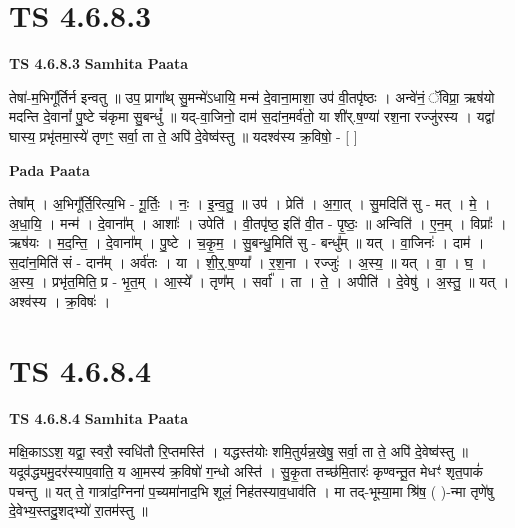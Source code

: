 \documentclass[17pt]{extarticle}
\begin{document}
\section*{ TS 4.6.8.3 }

\textbf{TS 4.6.8.3 } \newline
\textbf{Samhita Paata} \newline

तेषा॑-म॒भिगू᳚र्तिर्न इन्वतु ॥ उप॒ प्रागा᳚थ् सु॒मन्मे॑ऽधायि॒ मन्म॑ दे॒वाना॒माशा॒ उप॑ वी॒तपृ॑ष्ठः । अन्वे॑नं॒ ॅविप्रा॒ ऋष॑यो मदन्ति दे॒वानां᳚ पु॒ष्टे च॑कृमा सु॒बन्धुं᳚ ॥ यद्-वा॒जिनो॒ दाम॑ स॒दांन॒मर्व॑तो॒ या शी॑र्.ष॒ण्या॑ रश॒ना रज्जु॑रस्य । यद्वा॑ घास्य॒ प्रभृ॑तमा॒स्ये॑ तृणꣳ॒॒ सर्वा॒ ता ते॒ अपि॑ दे॒वेष्व॑स्तु ॥ यदश्व॑स्य क्र॒विषो॒ - [  ] \newline

\textbf{Pada Paata} \newline

तेषा᳚म् । अ॒भिगू᳚र्ति॒रित्य॒भि - गू॒र्तिः॒ । नः॒ । इ॒न्व॒तु॒ ॥ उप॑ । प्रेति॑ । अ॒गा॒त् । सु॒मदिति॑ सु - मत् । मे॒ । अ॒धा॒यि॒ । मन्म॑ । दे॒वाना᳚म् । आशाः᳚ । उपेति॑ । वी॒तपृ॑ष्ठ॒ इति॑ वी॒त - पृ॒ष्ठः॒ ॥ अन्विति॑ । ए॒न॒म् । विप्राः᳚ । ऋष॑यः । म॒द॒न्ति॒ । दे॒वाना᳚म् । पु॒ष्टे । च॒कृ॒म॒ । सु॒बन्धु॒मिति॑ सु - बन्धु᳚म् ॥ यत् । वा॒जिनः॑ । दाम॑ । स॒दांन॒मिति॑ सं - दान᳚म् । अर्व॑तः । या । शी॒र्॒.ष॒ण्या᳚ । र॒श॒ना । रज्जुः॑ । अ॒स्य॒ ॥ यत् । वा॒ । घ॒ । अ॒स्य॒ । प्रभृ॑त॒मिति॒ प्र - भृ॒त॒म् । आ॒स्ये᳚ । तृण᳚म् । सर्वा᳚ । ता । ते॒ । अपीति॑ । दे॒वेषु॑ । अ॒स्तु॒ ॥ यत् । अश्व॑स्य । क्र॒विषः॑ ।  \newline




\section*{ TS 4.6.8.4 }

\textbf{TS 4.6.8.4 } \newline
\textbf{Samhita Paata} \newline

मक्षि॒काऽऽश॒ यद्वा॒ स्वरौ॒ स्वधि॑तौ रि॒प्तमस्ति॑ । यद्धस्त॑योः शमि॒तुर्यन्न॒खेषु॒ सर्वा॒ ता ते॒ अपि॑ दे॒वेष्व॑स्तु ॥ यदूव॑द्ध्यमु॒दर॑स्याप॒वाति॒ य आ॒मस्य॑ क्र॒विषो॑ ग॒न्धो अस्ति॑ । सु॒कृ॒ता तच्छ॑मि॒तारः॑ कृण्वन्तू॒त मेधꣳ॑ शृत॒पाकं॑ पचन्तु ॥ यत् ते॒ गात्रा॑द॒ग्निना॑ प॒च्यमा॑नाद॒भि शूलं॒ निह॑तस्याव॒धाव॑ति । मा तद्-भूम्या॒मा श्रि॑ष॒ ( )-न्मा तृणे॑षु दे॒वेभ्य॒स्तदु॒शद्भ्यो॑ रा॒तम॑स्तु ॥ \newline
\end{document}
